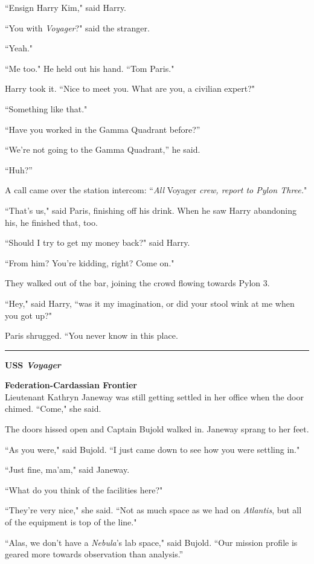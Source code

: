 \documentclass[twoside,letterpaper,12pt]{memoir}
\begin{document}
``Ensign Harry Kim," said Harry.

``You with \textit{Voyager}?" said the stranger.

``Yeah."

``Me too." He held out his hand. ``Tom Paris."

Harry took it. ``Nice to meet you. What are you, a civilian expert?"

``Something like that."

``Have you worked in the Gamma Quadrant before?''

``We're not going to the Gamma Quadrant,'' he said.

``Huh?''

A call came over the station intercom: ``\textit{All} Voyager \textit{crew, report to Pylon Three.}"

``That's us," said Paris, finishing off his drink. When he saw Harry abandoning his, he finished that, too.

``Should I try to get my money back?" said Harry.

``From him? You're kidding, right? Come on."

They walked out of the bar, joining the crowd flowing towards Pylon 3.

``Hey," said Harry, ``was it my imagination, or did your stool wink at me when you got up?"

Paris shrugged. ``You never know in this place.


\fancybreak{\rule{3cm}{0.4 pt}}
\noindent\textbf{USS \textit{Voyager}}

\noindent\textbf{Federation-Cardassian Frontier}\\

Lieutenant Kathryn Janeway was still getting settled in her office when the door chimed. ``Come," she said.

The doors hissed open and Captain Bujold walked in. Janeway sprang to her feet.

``As you were," said Bujold. ``I just came down to see how you were settling in."

``Just fine, ma'am," said Janeway.

``What do you think of the facilities here?"

``They're very nice," she said. ``Not as much space as we had on \textit{Atlantis}, but all of the equipment is top of the line."

``Alas, we don’t have a \textit{Nebula}’s lab space," said Bujold. ``Our mission profile is geared more towards observation than analysis.''
\end{document}
